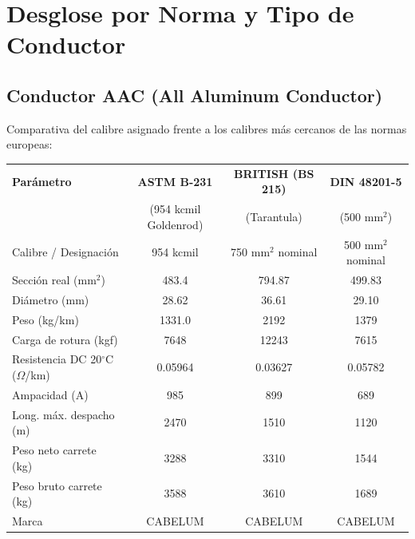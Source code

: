\documentclass[12pt,a4paper]{article}
\begin{document}
\section{Desglose por Norma y Tipo de Conductor}

\begin{landscape}
\subsection{Conductor AAC (All Aluminum Conductor)}

Comparativa del calibre asignado frente a los calibres más cercanos de las
normas europeas:
\begin{center}
\begin{tabular}{p{4cm}c|c|c}
\toprule
\textbf{Parámetro} & \textbf{ASTM B-231} & \textbf{BRITISH (BS 215)} & \textbf{DIN 48201-5} \\
& (954 kcmil Goldenrod) & (Tarantula) & (500 mm$^2$) \\
\midrule
Calibre / Designación & 954 kcmil & 750 mm$^2$ nominal & 500 mm$^2$ nominal \\
\midrule
Sección real (mm$^2$) & 483.4 & 794.87 & 499.83 \\
\midrule
Diámetro (mm) & 28.62 & 36.61 & 29.10 \\
\midrule
Peso (kg/km) & 1331.0 & 2192 & 1379 \\
\midrule
Carga de rotura (kgf) & 7648 & 12243 & 7615 \\
\midrule
Resistencia DC 20$^\circ$C ($\Omega$/km) & 0.05964 & 0.03627 & 0.05782 \\
\midrule
Ampacidad (A) & 985 & 899 & 689 \\
\midrule
Long. máx. despacho (m) & 2470 & 1510 & 1120 \\
\midrule
Peso neto carrete (kg) & 3288 & 3310 & 1544 \\
\midrule
Peso bruto carrete (kg) & 3588 & 3610 & 1689 \\
\midrule
Marca & CABELUM & CABELUM & CABELUM \\
\bottomrule
\end{tabular}
\end{center}
\end{landscape}
\end{document}
